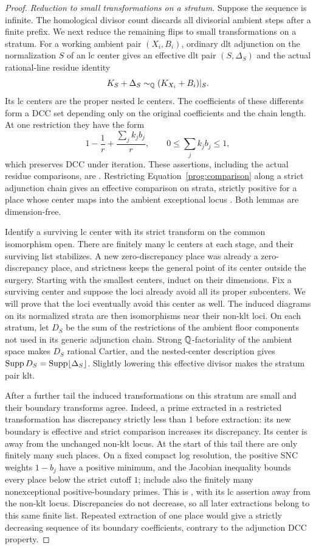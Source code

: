 \begin{proof}
\smallskip\noindent\emph{Reduction to small transformations on a stratum.}
Suppose the sequence is infinite.  The homological divisor
count \cite[Lemma~7.8]{CB} discards all divisorial ambient
steps after a finite prefix.  We next reduce the remaining
flips to small transformations on a stratum.
For a working ambient pair \((X_i,B_i)\), ordinary dlt
adjunction on the normalization \(S\) of an lc center gives
an effective dlt pair \((S,\Delta_S)\) and the
actual rational-line residue identity
\[
 K_S+\Delta_S\sim_{\mathbb Q}(K_{X_i}+B_i)|_S.
\]
Its lc centers are the proper nested lc centers.  The
coefficients of these differents form a DCC set depending
only on the original coefficients and the chain length.  At
one restriction they have the form
\[
 1-\frac1r+\frac{\sum_j k_jb_j}{r},
 \qquad 0\leq\sum_j k_jb_j\leq1,
\]
which preserves DCC under iteration.  These assertions,
including the actual residue comparisons, are
\cite[Lemma~7.16]{CB}.  Restricting
Equation~\eqref{prog:comparison} along a strict adjunction chain
gives an effective comparison on strata, strictly positive
for a place whose center maps into the ambient exceptional
locus \cite[Lemma~7.17]{CB}.  Both lemmas are
dimension-free.

Identify a surviving lc center with its strict transform on the common
isomorphism open. There are finitely many lc centers at each stage, and
their surviving list stabilizes. A new zero-discrepancy place was
already a zero-discrepancy place, and strictness keeps the
general point of its center outside the surgery. Starting with the smallest
centers, induct on their dimensions. Fix a surviving center and suppose the
loci already avoid all its proper subcenters. We will prove that the loci
eventually avoid this center as well. The induced diagrams on its normalized
strata are then isomorphisms near their non-klt loci.  On
each stratum, let \(D_S\) be the sum of the restrictions of the ambient
floor components not used in its generic adjunction chain. Strong
\(\mathbb Q\)-factoriality of the ambient space makes \(D_S\) rational Cartier,
and the nested-center description gives
\(\operatorname{Supp} D_S=\operatorname{Supp}\lfloor\Delta_S\rfloor\). Slightly lowering this
effective divisor makes the stratum pair klt.

After a further tail the induced transformations on this
stratum are small and their boundary transforms agree.
Indeed, a prime extracted in a restricted transformation
has discrepancy strictly less than \(1\) before extraction:
its new boundary is effective and strict comparison
increases its discrepancy.  Its center is away from the
unchanged non-klt locus.  At the start of this tail there are
only finitely many such places.  On a fixed compact log
resolution, the positive SNC weights \(1-b_j\) have a
positive minimum, and the Jacobian inequality bounds every
place below the strict cutoff \(1\); include also the
finitely many nonexceptional positive-boundary primes.
This is \cite[Lemma~7.9]{CB}, with its lc assertion away
from the non-klt locus.  Discrepancies do not decrease, so
all later extractions belong to this same finite list.
Repeated extraction of one place would give a strictly
decreasing sequence of its boundary coefficients, contrary
to the adjunction DCC property.


\end{proof}
